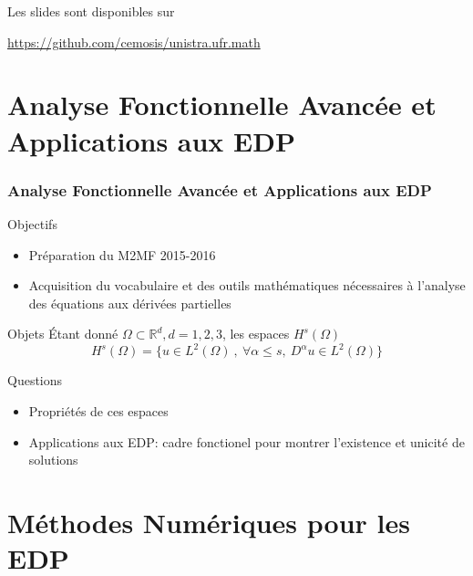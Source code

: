 \documentclass{beamer}
\begin{document}
\begin{frame}
  Les slides sont disponibles sur
  \begin{center}
    \centerline{\url{https://github.com/cemosis/unistra.ufr.math}}
  \end{center}
\end{frame}

\section{Analyse Fonctionnelle Avanc{\'e}e et Applications aux EDP}

\begin{frame}\frametitle{Analyse Fonctionnelle Avanc{\'e}e et Applications
    aux EDP}
  \begin{block}{Objectifs}
    \begin{itemize}
    \item Pr{\'e}paration du M2MF 2015-2016
    \item Acquisition du vocabulaire et des outils math{\'e}matiques n{\'e}cessaires {\`a}
      l'analyse des {\'e}quations aux d{\'e}riv{\'e}es partielles
    \end{itemize}
  \end{block}
  \begin{block}{Objets}
    {\'E}tant donn{\'e} $\Omega \subset \mathbb{R}^d, d=1,2,3$, les espaces $H^s(\Omega)$
    \begin{equation*}
      H^s(\Omega)=\{ u \in L^2(\Omega)~,~\forall\alpha \le s,~D^\alpha u\in L^2(\Omega)\}
    \end{equation*}
  \end{block}
  \begin{block}{Questions}
    \begin{itemize}
    \item Propri{\'e}t{\'e}s de ces espaces
    \item Applications aux EDP: cadre fonctionel pour montrer
      l'existence et unicit{\'e} de solutions
    \end{itemize}
  \end{block}
\end{frame}

\section{M{\'e}thodes Num{\'e}riques pour les EDP}
\end{document}
